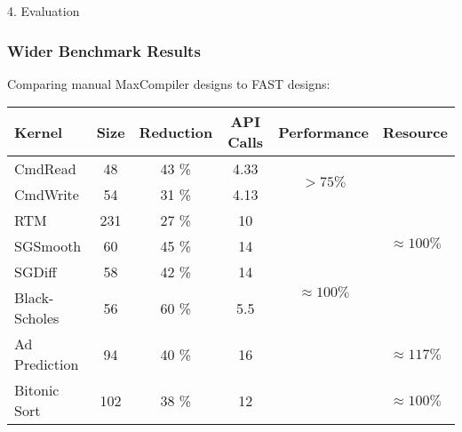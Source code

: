 \begin{frame}{4. Evaluation}
  \frametitle{Wider Benchmark Results}
  Comparing manual MaxCompiler designs to FAST designs:
  {\footnotesize
    \begin{table}
      \renewcommand{\arraystretch}{1.5}
      \begin{tabular}{l|c|c|c|c|c}
        \textbf{Kernel} & \textbf{Size} & \textbf{Reduction} & \textbf{API Calls} & \textbf{Performance}              & \textbf{Resource}
        \\
        \hline\hline
        CmdRead       & 48 & 43 \%               & 4.33                     & \multirow{2}{1.5cm}{$ > 75\%$}        & \multirow{6}{1.5cm}{$\approx 100\%$} \\
        CmdWrite      & 54  & 31 \%              & 4.13                     &                                   &                              \\
        \cline{1-4}
        RTM            & 231 & 27 \%              & 10                       & \multirow{5}{1.5cm}{$ \approx 100\%$} &                              \\
        SGSmooth      & 60 & 45 \%              & 14                       &                                   &                              \\
        SGDiff       & 58 & 42 \%              & 14                       &                                   &                              \\
        Black-Scholes & 56  & 60 \%               & 5.5                      &                                   &                              \\
        \cline{5-5}
        Ad Prediction & 94 & 40 \%             & 16                       &                                   &    $ \approx 117 \% $                          \\
        Bitonic Sort & 102 & 38 \%             & 12                    &                                   &    $ \approx 100 \% $                          \\
      \end{tabular}
    \end{table}}

\end{frame}
